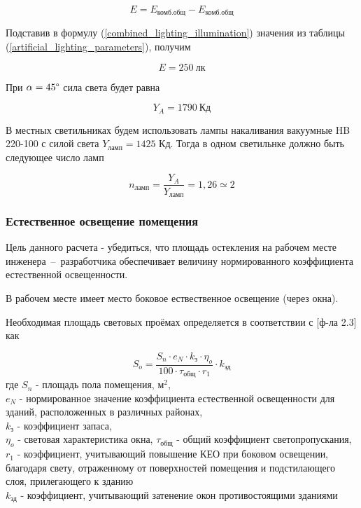 \begin{equation}
    E = E_\text{комб.общ} - E_\text{комб.общ}
    \label{combined_lighting_illumination}
\end{equation}

Подставив в формулу (\ref{combined_lighting_illumination}) значения из таблицы
(\ref{artificial_lighting_parameters}), получим

$$
    E = 250 ~\text{лк}
$$

При $\alpha = 45 \degree$ сила света будет равна

$$
    Y_A = 1790 ~\text{Кд}
$$

В местных светильниках будем использовать лампы накаливания вакуумные HB 220-100
с силой света $Y_\text{ламп} = 1425$ Кд. Тогда в одном светильнке должно быть следующее число
ламп

$$
    n_\text{ламп} = \frac{Y_A}{Y_\text{ламп}} = 1,26 \simeq 2
$$

\subsubsection{Естественное освещение помещения}

Цель данного расчета - убедиться, что площадь остекления на рабочем месте
инженера~--~разработчика обеспечивает величину нормированного коэффициента
естественной освещенности.

В рабочем месте имеет место боковое ествественное освещение (через окна).

Необходимая площадь световых проёмах определяется в соответствии с
\cite{lighting_calc_method}[ф-ла 2.3] как

\begin{equation}
    S_o = \frac{S_n \cdot e_N \cdot k_\text{з} \cdot \eta_o}{100 \cdot \tau_\text{общ} \cdot r_1}
            \cdot k_\text{зд}
    \label{windows_area}
\end{equation}
где $S_n$ - площадь пола помещения, $\text{м}^2$,                                   \\
$e_N$ - нормированное значение коэффициента естественной освещенности для зданий,
расположенных в различных районах,                                                  \\
$k_\text{з}$ - коэффициент запаса,                                                  \\
$\eta_o$ - световая характеристика окна,
$\tau_\text{общ}$ - общий коэффициент светопропускания,                             \\
$r_1$ - коэффициент, учитывающий повышение КЕО при боковом освещении, благодаря
свету, отраженному от поверхностей помещения и подстилающего слоя, прилегающего
к зданию                                                                            \\
$k_\text{зд}$ - коэффициент, учитывающий затенение окон противостоящими зданиями

